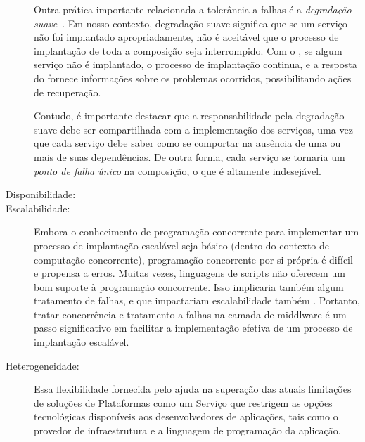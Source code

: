 \begin{description}

Outra prática importante relacionada a tolerância a falhas é a 
\emph{degradação suave}~\cite{Brewer2001GiantScale,Hamilton2007InternetScale}.
Em nosso contexto, degradação suave significa que se um serviço não foi 
implantado apropriadamente, não é aceitável que o processo de implantação
de toda a composição seja interrompido.
Com o \ee, se algum serviço não é implantado, o processo de implantação continua,
e a resposta do \ee fornece informações sobre os problemas ocorridos,
possibilitando ações de recuperação.

Contudo, é importante destacar que a responsabilidade pela degradação suave
debe ser compartilhada com a implementação dos serviços, uma vez que cada serviço
debe saber como se comportar na ausência de uma ou mais de suas dependências.
De outra forma, cada serviço se tornaria um \emph{ponto de falha único} na composição,
o que é altamente indesejável.

\item [Disponibilidade:]

\item [Escalabilidade:]

Embora o conhecimento de programação concorrente para implementar
um processo de implantação escalável seja básico (dentro do contexto de computação concorrente),
programação concorrente por si própria é difícil e propensa a erros.
Muitas vezes, linguagens de scripts não oferecem um bom suporte à programação concorrente.
Isso implicaria também algum tratamento de falhas,
e que impactariam escalabilidade também .
Portanto, tratar concorrência e tratamento a falhas na camada de middlware
é um passo significativo em facilitar a implementação efetiva de um
processo de implantação escalável.

\item [Heterogeneidade:]


%

Essa flexibilidade fornecida pelo \ee ajuda na superação
das atuais limitações de soluções de Plataformas como um Serviço
que restrigem as opções tecnológicas disponíveis aos desenvolvedores de aplicações,
tais como o provedor de infraestrutura e a linguagem de programação da aplicação.


\end{description}
